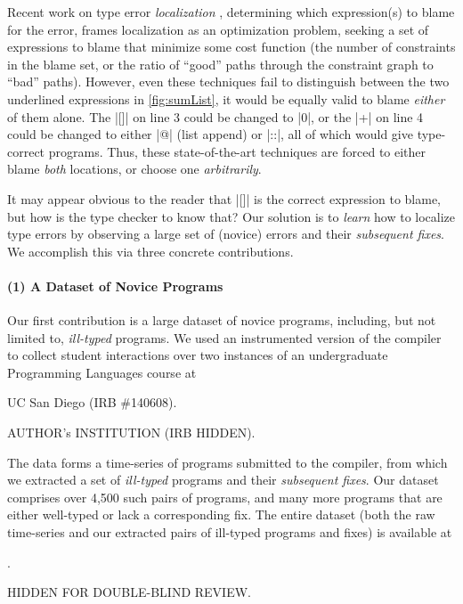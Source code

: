 Recent work on type error \emph{localization}
%
\citep[\eg][]{Zhang2014-lv,Loncaric2016-uk,Pavlinovic2014-mr},
%
determining which expression(s) to blame for the error,
frames localization as an optimization problem, seeking a set of
expressions to blame that minimize some cost function (\eg the number of
constraints in the blame set, or the ratio of ``good'' paths through the
constraint graph to ``bad'' paths).
%
However, even these techniques fail to distinguish between the two
underlined expressions in \autoref{fig:sumList}, it would be equally
valid to blame \emph{either} of them alone.
%
The |[]| on line 3 could be changed to |0|, or the |+| on line 4 could
be changed to either |@| (list append) or |::|, all of which would give
type-correct programs.
%
Thus, these state-of-the-art techniques are forced to either blame
\emph{both} locations, or choose one \emph{arbitrarily}.

It may appear obvious to the reader that |[]| is the correct expression
to blame, but how is the type checker to know that?
%
Our solution is to \emph{learn} how to localize type errors by observing
a large set of (novice) errors and their \emph{subsequent fixes}.
%
We accomplish this via three concrete contributions.

\paragraph{\textbf{(1) A Dataset of Novice \ocaml Programs}}
Our first contribution is a large dataset of novice \ocaml programs,
including, but not limited to, \emph{ill-typed} programs.
%
We used an instrumented version of the \ocaml compiler to collect
student interactions over two instances of an undergraduate Programming
Languages course at
%
\begin{anonsuppress}
UC San Diego (IRB \#140608).
\end{anonsuppress}
\begin{noanonsuppress}
AUTHOR's INSTITUTION (IRB HIDDEN).
\end{noanonsuppress}
%
The data forms a time-series of programs submitted to the \ocaml
compiler, from which we extracted a set of \emph{ill-typed} programs
and their \emph{subsequent fixes}.
%
Our dataset comprises over 4,500 such pairs of programs, and many more
programs that are either well-typed or lack a corresponding fix.
%
The entire dataset (both the raw time-series and our extracted pairs of
ill-typed programs and fixes) is available at
%
\begin{anonsuppress}
.
\end{anonsuppress}
\begin{noanonsuppress}
HIDDEN FOR DOUBLE-BLIND REVIEW.
\end{noanonsuppress}
%

